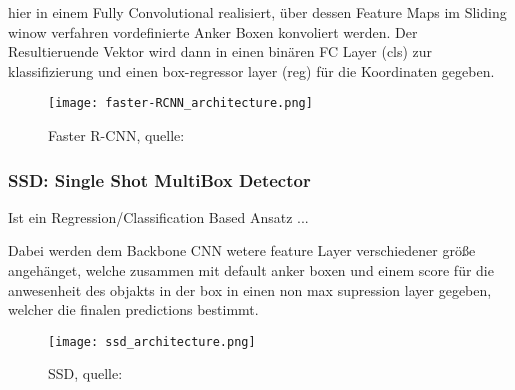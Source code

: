 hier in einem Fully Convolutional realisiert, über dessen 
Feature Maps im Sliding winow verfahren vordefinierte Anker
 Boxen konvoliert werden. Der Resultieruende Vektor wird 
 dann in einen binären FC Layer (cls) zur klassifizierung und 
einen box-regressor layer (reg) für die Koordinaten gegeben.


\begin{figure}[H]
    \centering
    \label{fig:faster_rcnn}
    \texttt{[image: faster-RCNN\_architecture.png]}
    \caption{Faster R-CNN, quelle: \cite{ObjectDetectionDummies2017b}}
\end{figure}



\subsubsection{SSD: Single Shot MultiBox Detector}
Ist ein Regression/Classification Based Ansatz ... \cite{liuSSDSingleShot2016}

Dabei werden dem Backbone CNN wetere feature Layer verschiedener größe 
angehänget, welche zusammen mit default anker boxen und einem score 
für die anwesenheit des objakts in der box in einen non max supression 
layer gegeben, welcher die finalen predictions bestimmt.


\begin{figure}[H]
    \centering
    \label{fig:faster_rcnn}
    \texttt{[image: ssd\_architecture.png]}
    \caption{SSD, quelle: \cite{SSDSingleShot}}
\end{figure}


